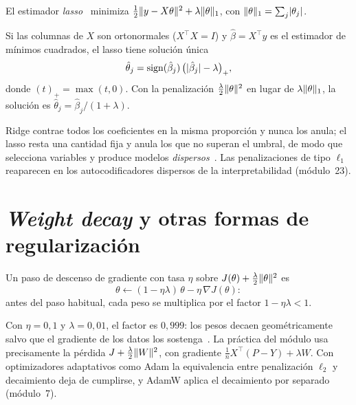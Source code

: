 \begin{definicion}[Lasso]
El estimador \emph{lasso}~\cite{lasso} minimiza $\frac12\lVert y-X\theta\rVert^{2}+\lambda\lVert\theta\rVert_1$, con $\lVert\theta\rVert_1=\sum_j\lvert\theta_j\rvert$.
\end{definicion}

\begin{proposicion}\label{prop:umbral}
Si las columnas de $X$ son ortonormales ($X^{\top}X=I$) y $\hat\beta=X^{\top}y$ es el estimador de mínimos cuadrados, el lasso tiene solución única
\[
\hat\theta_j=\operatorname{sign}(\hat\beta_j)\,\bigl(\lvert\hat\beta_j\rvert-\lambda\bigr)_{+},
\]
donde $(t)_{+}=\max(t,0)$. Con la penalización $\frac{\lambda}{2}\lVert\theta\rVert^{2}$ en lugar de $\lambda\lVert\theta\rVert_1$, la solución es $\hat\theta_j=\hat\beta_j/(1+\lambda)$.
\end{proposicion}

Ridge contrae todos los coeficientes en la misma proporción y nunca los anula; el lasso resta una cantidad fija y anula los que no superan el umbral, de modo que selecciona variables y produce modelos \emph{dispersos}~\cite[§3.4.2--3.4.3]{esl}. Las penalizaciones de tipo $\ell_1$ reaparecen en los autocodificadores dispersos de la interpretabilidad (módulo~23).

\section{\emph{Weight decay} y otras formas de regularización}

\begin{proposicion}\label{prop:weight-decay}
Un paso de descenso de gradiente con tasa $\eta$ sobre $J(\theta)+\frac{\lambda}{2}\lVert\theta\rVert^{2}$ es
\[
\theta\leftarrow(1-\eta\lambda)\,\theta-\eta\,\nabla J(\theta):
\]
antes del paso habitual, cada peso se multiplica por el factor $1-\eta\lambda<1$.
\end{proposicion}

Con $\eta=0{,}1$ y $\lambda=0{,}01$, el factor es $0{,}999$: los pesos decaen geométricamente salvo que el gradiente de los datos los sostenga~\cite[§3.7.1]{d2l}. La práctica del módulo usa precisamente la pérdida $J+\frac{\lambda}{2}\lVert W\rVert^{2}$, con gradiente $\frac1nX^{\top}(P-Y)+\lambda W$. Con optimizadores adaptativos como Adam la equivalencia entre penalización $\ell_2$ y decaimiento deja de cumplirse, y AdamW aplica el decaimiento por separado~\cite{adamw} (módulo~7).

